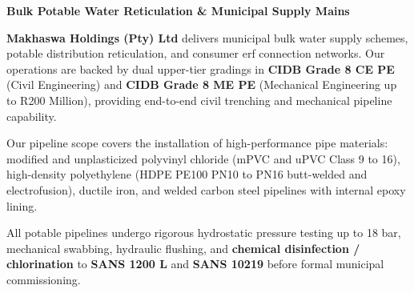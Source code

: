 \documentclass[a4paper,11pt]{article}
\begin{document}
\noindent
\begin{minipage}[t]{0.62\textwidth}
    \vspace{0pt}
    {\large\bfseries\color{mhnavy} Bulk Potable Water Reticulation \& Municipal Supply Mains}
    \vspace{0.12cm}

    {\fontsize{9pt}{13pt}\selectfont\color{mhtext}
    \textbf{Makhaswa Holdings (Pty) Ltd} delivers municipal bulk water supply schemes, potable distribution reticulation, and consumer erf connection networks. Our operations are backed by dual upper-tier gradings in \textbf{CIDB Grade 8 CE PE} (Civil Engineering) and \textbf{CIDB Grade 8 ME PE} (Mechanical Engineering up to R200 Million), providing end-to-end civil trenching and mechanical pipeline capability.
    }

    \vspace{0.22cm}

    {\fontsize{9pt}{13pt}\selectfont\color{mhtext}
    Our pipeline scope covers the installation of high-performance pipe materials: modified and unplasticized polyvinyl chloride (mPVC and uPVC Class 9 to 16), high-density polyethylene (HDPE PE100 PN10 to PN16 butt-welded and electrofusion), ductile iron, and welded carbon steel pipelines with internal epoxy lining.
    }

    \vspace{0.22cm}

    {\fontsize{9pt}{13pt}\selectfont\color{mhtext}
    All potable pipelines undergo rigorous hydrostatic pressure testing up to 18 bar, mechanical swabbing, hydraulic flushing, and \textbf{chemical disinfection / chlorination} to \textbf{SANS 1200 L} and \textbf{SANS 10219} before formal municipal commissioning.
    }
\end{minipage}
\hfill
\end{document}
